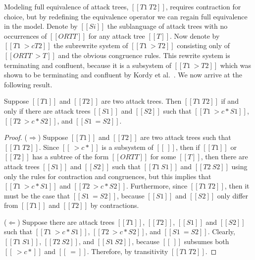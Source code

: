 Modeling full equivalence of attack trees, $[[T1 ~ T2]]$, requires
contraction for choice, but by redefining the equivalence operator we
can regain full equivalence in the model.  Denote by $[[Si]]$ the
sublanguage of attack trees with no occurrences of $[[OR T T]]$ for
any attack tree $[[T]]$.  Now denote by $[[T1 ~>c T2]]$ the subrewrite
system of $[[T1 ~> T2]]$ consisting only of $[[OR T T ~> T]]$ and the
obvious congruence rules.  This rewrite system is terminating and
confluent, because it is a subsystem of $[[T1 ~> T2]]$ which was shown
to be terminating and confluent by Kordy et al.~\cite{Kordy2017}.  We
now arrive at the following result.
\begin{lemma}
  \label{lemma:new-equivalence-atrees}
  Suppose $[[T1]]$ and $[[T2]]$ are two attack trees.  Then $[[T1 ~
      T2]]$ if and only if there are attack trees $[[S1]]$ and
  $[[S2]]$ such that $[[T1 ~>c* S1]]$, $[[T2 ~>c* S2]]$, and $[[S1 ~=
      S2]]$.
\end{lemma}
\begin{proof}
  ($\Rightarrow$) Suppose $[[T1]]$ and $[[T2]]$ are two attack trees
  such that $[[T1 ~ T2]]$.  Since $[[~>c*]]$ is a subsystem of
  $[[~]]$, then if $[[T1]]$ or $[[T2]]$ has a subtree of the form
  $[[OR T T]]$ for some $[[T]]$, then there are attack trees $[[S1]]$
  and $[[S2]]$ such that $[[T1 ~ S1]]$ and $[[T2 ~ S2]]$ using only
  the rules for contraction and congruences, but this implies that
  $[[T1 ~>c* S1]]$ and $[[T2 ~>c* S2]]$.  Furthermore, since $[[T1 ~
      T2]]$, then it must be the case that $[[S1 ~= S2]]$, because
  $[[S1]]$ and $[[S2]]$ only differ from $[[T1]]$ and $[[T2]]$ by
  contractions.

  \noindent
  ($\Leftarrow$) Suppose there are attack trees $[[T1]]$, $[[T2]]$,
  $[[S1]]$ and $[[S2]]$ such that $[[T1 ~>c* S1]]$, $[[T2 ~>c* S2]]$,
  and $[[S1 ~= S2]]$.  Clearly, $[[T1 ~ S1]]$, $[[T2 ~ S2]]$, and
  $[[S1 ~ S2]]$, because $[[~]]$ subsumes both $[[~>c*]]$ and
  $[[~=]]$.  Therefore, by transitivity $[[T1 ~ T2]]$.
\end{proof}

